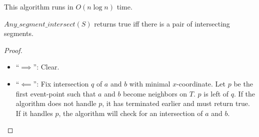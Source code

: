 This algorithm runs in $O(n \log n)$ time.

\begin{mylemma}
${Any\_segment\_intersect}(S)$ returns true iff there is a pair of intersecting segments.
\end{mylemma}
\begin{proof}
\begin{itemize}
		\item ``$\implies$'': Clear.
		\item ``$\impliedby$'': Fix intersection $q$ of $a$ and $b$ with minimal $x$-coordinate. Let $p$ be the first event-point such that $a$ and $b$ become neighbors on $T$. $p$ is left of $q$. If the algorithm does not handle $p$, it has terminated earlier and must return true. If it handles $p$, the algorithm will check for an intersection of $a$ and $b$.

	\end{itemize}

\end{proof}

